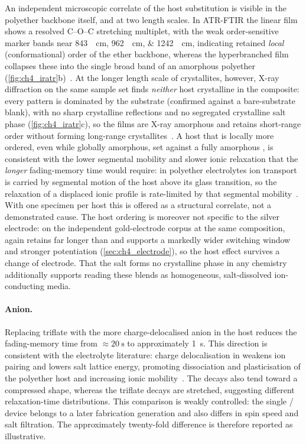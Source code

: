 \documentclass[12pt, twoside]{report}
\begin{document}
An independent microscopic correlate of the host substitution is visible in the polyether backbone itself, and at two length scales. In ATR-FTIR the linear \PEO{} film shows a resolved C--O--C stretching multiplet, with the weak order-sensitive marker bands near \SIlist{843;962;1242}{\per\centi\meter}, indicating retained \emph{local} (conformational) order of the ether backbone, whereas the hyperbranched \TMPE{} film collapses these into the single broad band of an amorphous polyether (\cref{fig:ch4_iratr}b)~\cite{Frech1999PEOLiTf}. At the longer length scale of crystallites, however, X-ray diffraction on the same sample set finds \emph{neither} host crystalline in the composite: every pattern is dominated by the \ITO{} substrate (confirmed against a bare-substrate blank), with no sharp \PEO{} crystalline reflections and no segregated crystalline salt phase (\cref{fig:ch4_iratr}c), so the films are X-ray amorphous and \PEO{} retains short-range order without forming long-range crystallites~\cite{Lightfoot1993,Frech1999PEOLiTf}. A host that is locally more ordered, even while globally amorphous, set against a fully amorphous \TMPE{}, is consistent with the lower segmental mobility and slower ionic relaxation that the \emph{longer} \PEO{} fading-memory time would require: in polyether electrolytes ion transport is carried by segmental motion of the host above its glass transition, so the relaxation of a displaced ionic profile is rate-limited by that segmental mobility~\cite{Armand1989,RatnerShriver1988,Druger1983}. With one specimen per host this is offered as a structural correlate, not a demonstrated cause. The host ordering is moreover not specific to the silver electrode: on the independent gold-electrode corpus at the same composition, \PEO{} again retains far longer than \TMPE{} and supports a markedly wider switching window and stronger potentiation (\cref{sec:ch4_electrode}), so the host effect survives a change of electrode. That the salt forms no crystalline phase in any chemistry additionally supports reading these blends as homogeneous, salt-dissolved ion-conducting media.

\paragraph{Anion.} Replacing triflate with the more charge-delocalised \TFSI{} anion in the \PEO{} host reduces the fading-memory time from \(\approx\SI{20}{\second}\) to approximately \SI{1}{\second}. This direction is consistent with the electrolyte literature: charge delocalisation in \TFSI{} weakens ion pairing and lowers salt lattice energy, promoting dissociation and plasticisation of the polyether host and increasing ionic mobility~\cite{Vallee1992,BruceVincent1993}. The \TFSI{} decays also tend toward a compressed shape, whereas the triflate decays are stretched, suggesting different relaxation-time distributions. This comparison is weakly controlled: the single \PEO{}/\TFSI{} device belongs to a later fabrication generation and also differs in spin speed and salt filtration. The approximately twenty-fold difference is therefore reported as illustrative.
\end{document}

